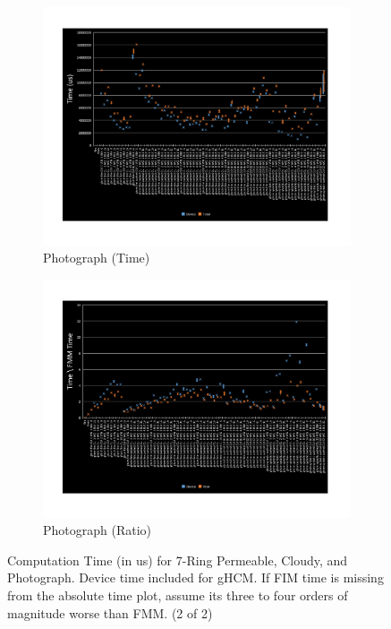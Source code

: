 \documentclass[11pt]{article}       %
\begin{document}
\begin{figure}
	\begin{subfigure}[b]{.4\columnwidth}
		\includegraphics[width=\textwidth]{Figures/time-photo}
		\caption{Photograph (Time)}
	\end{subfigure}
	\begin{subfigure}[b]{.4\columnwidth}
		\includegraphics[width=\textwidth]{Figures/ratio-time-photo}
		\caption{Photograph (Ratio)}
	\end{subfigure}
	\caption{Computation Time (in us) for 7-Ring Permeable, Cloudy, and Photograph. Device time included for gHCM. If FIM time is missing from the absolute time plot, assume its three to four orders of magnitude worse than FMM. (2 of 2)}
	\label{fig:perf_results_main_2}
\end{figure}
\end{document}
